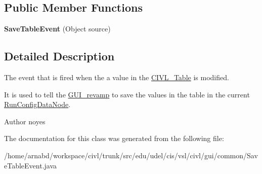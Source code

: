 \subsection*{Public Member Functions}
\begin{DoxyCompactItemize}
\item 
\hypertarget{classedu_1_1udel_1_1cis_1_1vsl_1_1civl_1_1gui_1_1common_1_1SaveTableEvent_afc3463f3db809618d3059c82c3c0bd37}{}{\bfseries Save\+Table\+Event} (Object source)\label{classedu_1_1udel_1_1cis_1_1vsl_1_1civl_1_1gui_1_1common_1_1SaveTableEvent_afc3463f3db809618d3059c82c3c0bd37}

\end{DoxyCompactItemize}


\subsection{Detailed Description}
The event that is fired when the a value in the \hyperlink{}{C\+I\+V\+L\+\_\+\+Table} is modified. 

It is used to tell the \hyperlink{classedu_1_1udel_1_1cis_1_1vsl_1_1civl_1_1gui_1_1common_1_1GUI__revamp}{G\+U\+I\+\_\+revamp} to save the values in the table in the current \hyperlink{classedu_1_1udel_1_1cis_1_1vsl_1_1civl_1_1gui_1_1common_1_1RunConfigDataNode}{Run\+Config\+Data\+Node}.

\begin{DoxyAuthor}{Author}
noyes 
\end{DoxyAuthor}


The documentation for this class was generated from the following file\+:\begin{DoxyCompactItemize}
\item 
/home/arnabd/workspace/civl/trunk/src/edu/udel/cis/vsl/civl/gui/common/Save\+Table\+Event.\+java\end{DoxyCompactItemize}
